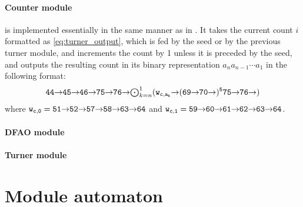 \documentclass[runningheads]{llncs}
\newcommand{\east}{{\ensuremath \to}}
\begin{document}
\paragraph{Counter module} is implemented essentially in the same manner as in \cite{GeMeScSe2016}. 
It takes the current count $i$ formatted as \eqref{eq:turner_output}, which is fed by the seed or by the previous turner module, and increments the count by 1 unless it is preceded by the seed, and outputs the resulting count in its binary representation $a_n a_{n-1} \cdots a_1$ in the following format:
\begin{equation}\label{eq:counter_output}{\tt 
	44 \east 45 \east 46 \east 75 \east 76 \east \mbox{$\bigodot_{k = n}^1$} (w_{c, a_k} \east (69 \east 70 \east)^5 75 \east 76 \east)
}\end{equation}
where ${\tt w_{c, 0} = 51 \east 52 \east 57 \east 58 \east 63 \east 64}$ and ${\tt w_{c, 1} = 59 \east 60 \east 61 \east 62 \east 63 \east 64}$. 

\paragraph{DFAO module}

\paragraph{Turner module}

	
	

	\newpage
	\appendix

	\section{Module automaton}
\end{document}
